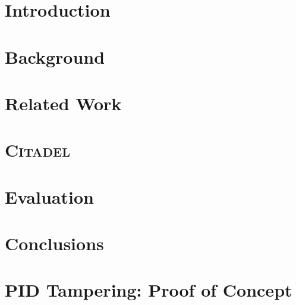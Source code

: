 \documentclass[a4paper,12pt,twoside,openright]{report}
\begin{document}
\pagestyle{empty}
\singlespacing
{}

\restoregeometry
\onehalfspacing

\singlespacing


\setcounter{page}{0}
\pagestyle{plain}
\tableofcontents
{}
\listoffigures
{}
\listoftables

\onehalfspacing



\raggedbottom

\chapter{Introduction}
\setcounter{page}{1} 


\chapter{Background} 
\label{sec:background}


\chapter{Related Work} 
\label{sec:related}


\chapter{\textsc{Citadel}}
\label{sec:design}


\chapter{Evaluation} 
\label{sec:eval}


\chapter{Conclusions}
\label{sec:conclusion}



\appendix
\singlespacing

\chapter{PID Tampering: Proof of Concept}
\label{appendix:pid-tampering}
\end{document}
